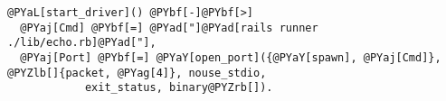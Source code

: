 \begin{Verbatim}[commandchars=@\[\]]
@PYaL[start_driver]() @PYbf[-]@PYbf[>]
  @PYaj[Cmd] @PYbf[=] @PYad["]@PYad[rails runner ./lib/echo.rb]@PYad["],
  @PYaj[Port] @PYbf[=] @PYaY[open_port]({@PYaY[spawn], @PYaj[Cmd]}, @PYZlb[]{packet, @PYag[4]}, nouse_stdio,
            exit_status, binary@PYZrb[]).
\end{Verbatim}
